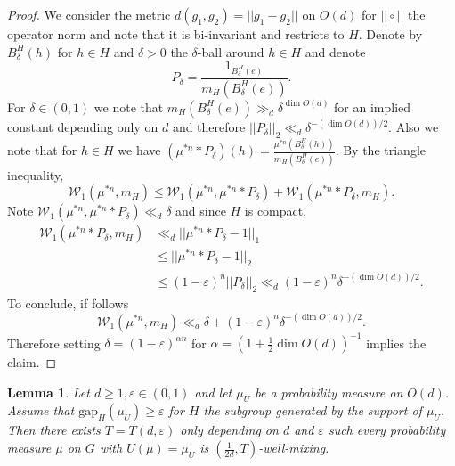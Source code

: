 \documentclass[10pt, english,oneside,reqno]{amsart}
\theoremstyle{plain}
\newtheorem{lemma}[theorem]{Lemma}
\theoremstyle{remark}
\numberwithin{equation}{section}
\numberwithin{figure}{section}
\newcommand{\eps}{\varepsilon}
\newcommand{\Haarof}[1]{m_{#1}}
\begin{document}
\begin{proof}
    We consider the metric $d(g_1, g_2) = ||g_1 - g_2||$ on $O(d)$ for $||\circ||$ the operator norm and note that it is bi-invariant and restricts to $H$. Denote by $B^H_{\delta}(h)$ for $h\in H$ and $\delta > 0$ the $\delta$-ball around $h\in H$ and denote $$P_{\delta} = \frac{1_{B^H_{\delta}(e)}}{\Haarof{H}(B^H_{\delta}(e))}.$$ For $\delta \in (0,1)$ we note that $\Haarof{H}(B^H_{\delta}(e)) \gg_d \delta^{\dim O(d)}$ for an implied constant depending only on $d$ and therefore $||P_{\delta}||_2  \ll_d \delta^{-(\dim O(d))/2}$. Also we note that for $h \in H$ we have $(\mu^{*n}*P_{\delta})(h) = \frac{\mu^{*n}(B_{\delta}^H(h))}{\Haarof{H}(B^H_{\delta}(e))}.$ By the triangle inequality, $$\mathcal{W}_1(\mu^{*n}, \Haarof{H}) \leq \mathcal{W}_1(\mu^{*n}, \mu^{*n}*P_{\delta}) + \mathcal{W}_1(\mu^{*n}*P_{\delta}, \Haarof{H}).$$ Note $\mathcal{W}_1(\mu^{*n}, \mu^{*n}*P_{\delta}) \ll_d \delta$ and since $H$ is compact, 
    \begin{align*}
        \mathcal{W}_1(\mu^{*n}*P_{\delta}, \Haarof{H}) &\ll_d ||\mu^{*n}*P_{\delta} - 1||_1 \\ &\leq ||\mu^{*n}*P_{\delta} - 1||_2 \\ & \leq (1-\eps)^n ||P_{\delta}||_2 \ll_d (1-\eps)^n \delta^{-(\dim O(d))/2}.
    \end{align*} To conclude, if follows $$\mathcal{W}_1(\mu^{*n}, \Haarof{H}) \ll_d \delta + (1-\eps)^n \delta^{-(\dim O(d))/2}.$$ Therefore setting $\delta = (1-\eps)^{\alpha n}$ for $\alpha = (1 + \frac{1}{2}\dim O(d))^{-1}$ implies the claim.
\end{proof}

\begin{lemma}\label{UnifWellMixSpecGap}
    Let $d\geq 1, \eps \in (0,1)$ and let $\mu_U$ be a probability measure on $O(d)$. Assume that $\mathrm{gap}_H(\mu_U) \geq \eps$ for $H$ the subgroup generated by the support of $\mu_U$. Then there exists $T = T(d,\eps)$ only depending on $d$ and $\eps$ such every probability measure $\mu$ on $G$ with $U(\mu) = \mu_U$ is $(\frac{1}{2d},T)$-well-mixing.
\end{lemma}
\end{document}
